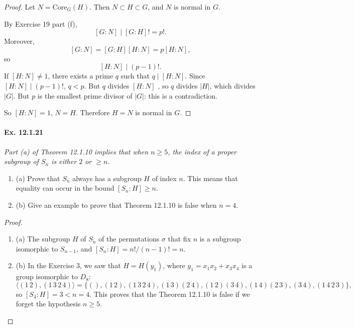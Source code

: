 \documentclass[11pt,a4paper]{article}
\newcommand{\be} {\begin{enumerate}}
\newcommand{\ee} {\end{enumerate}}
\begin{document}
\begin{proof}
Let $N = \mathrm{Core}_G(H)$. Then $N \subset H \subset G$, and $N$ is normal in $G$.

By Exercise 19 part (f),
$$[G:N] \mid [G:H]! = p!.$$
Moreover, 
$$[G:N] = [G:H] [H:N] = p [H:N],$$
so $$[H:N] \mid (p-1)!.$$
If $[H:N] \ne 1$, there exists a prime $q$ such that $q\mid [H:N]$. Since $[H:N] \mid (p-1)!$, $q<p$. But $q$ divides $[H:N]$ , so $q$ divides $|H|$, which divides $|G|$. But $p$ is the smallest prime divisor of $|G|$: this is a contradiction.

So $[H:N] = 1$, $N = H$. Therefore $H = N$ is normal in $G$.
\end{proof}

\paragraph{Ex. 12.1.21}

{\it Part (a) of Theorem 12.1.10 implies that when $n\geq 5$, the index of a proper subgroup of $S_n$ is either $2$ or $\geq n$.
\be
\item[(a)] Prove that $S_n$ always has a subgroup $H$ of index $n$. This means that equality can occur in the bound $[S_n:H] \geq n$.

\item[(b)] Give an example to prove that Theorem 12.1.10 is false when $n=4$.
\ee
}

\begin{proof}
\be
\item[(a)] The subgroup $H$ of $S_n$ of the permutations $\sigma$ that fix $n$ is a subgroup isomorphic to $S_{n-1}$, and $[S_n : H ] = n!/(n-1)! = n$.
\item[(b)] In the Exercise 3, we saw that $H = H(y_1)$, where $y_1 = x_1x_2+x_3x_4$ is a group isomorphic to $D_8$:
$$\langle (1\, 2), (1\,3\,2\,4) \rangle= \{(), (1\,2), (1\,3\,2\,4), (1\,3)(2\,4), (1\,2)(3\,4), (1\,4)(2\,3), (3\,4), (1\,4\,2\,3)\},$$
so $[S_4 : H] = 3 <n=4$. This proves that the Theorem 12.1.10 is false if we forget the hypothesis $n\geq 5$.
\ee
\end{proof}
\end{document}
